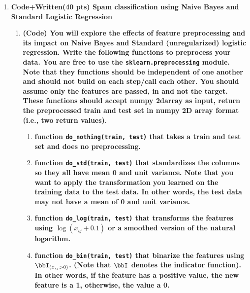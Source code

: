 \documentclass[a4paper,12pt]{article}
\theoremstyle{definition}
\theoremstyle{remark}
\begin{document}
\begin{enumerate}
		\item{\bf Code+Written(40 pts) Spam classification using Naive Bayes and Standard Logistic Regression}
		\begin{enumerate}
			\item {\bf (Code) You will explore the effects of feature preprocessing and its impact on Naive Bayes and Standard (unregularized) logistic regression. Write the following functions to preprocess your data. You are free to use the \texttt{sklearn.preprocessing} module. Note that they functions should be independent of one another and should not build on each step/call each other. You should assume only the features are passed, in and not the target. These functions should accept numpy 2darray as input, return the preprocessed train and test set in numpy 2D array format (i.e., two return values)}.
				\begin{enumerate}
					\item {\bf  function \texttt{do\_nothing(train, test)} that takes a train and test set and does no preprocessing.}
					\item {\bf function \texttt{do\_std(train, test)} that standardizes the columns so they all have mean 0 and unit variance. Note that you want to apply the transformation you learned on the training data to the test data. In other words, the test data may not have a mean of 0 and unit variance.}
					\item {\bf function \texttt{do\_log(train, test)} that transforms the features using $\log(x_{ij} + 0.1)$ or a smoothed version of the natural logarithm.}
					\item {\bf function \texttt{do\_bin(train, test)} that binarize the features using $\bbI_{(x_{ij} >0)}$.  (Note that $\bbI$ denotes the indicator function). In other words, if the feature has a positive value, the new feature is a 1, otherwise, the value a 0.}
				\end{enumerate}


\end{enumerate}
\end{enumerate}
\end{document}
